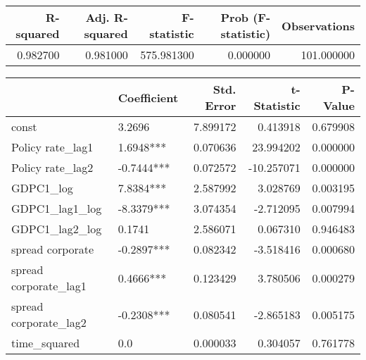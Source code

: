 \begin{tabular}{rrrrr}
\toprule
\textbf{R-squared} & \textbf{Adj. R-squared} & \textbf{F-statistic} & \textbf{Prob (F-statistic)} & \textbf{Observations} \\
\midrule
0.982700 & 0.981000 & 575.981300 & 0.000000 & 101.000000 \\
\bottomrule
\end{tabular}

\begin{tabular}{llrrr}
\toprule
 & \textbf{Coefficient} & \textbf{Std. Error} & \textbf{t-Statistic} & \textbf{P-Value} \\
\midrule
const & 3.2696 & 7.899172 & 0.413918 & 0.679908 \\
Policy rate_lag1 & 1.6948*** & 0.070636 & 23.994202 & 0.000000 \\
Policy rate_lag2 & -0.7444*** & 0.072572 & -10.257071 & 0.000000 \\
GDPC1_log & 7.8384*** & 2.587992 & 3.028769 & 0.003195 \\
GDPC1_lag1_log & -8.3379*** & 3.074354 & -2.712095 & 0.007994 \\
GDPC1_lag2_log & 0.1741 & 2.586071 & 0.067310 & 0.946483 \\
spread corporate & -0.2897*** & 0.082342 & -3.518416 & 0.000680 \\
spread corporate_lag1 & 0.4666*** & 0.123429 & 3.780506 & 0.000279 \\
spread corporate_lag2 & -0.2308*** & 0.080541 & -2.865183 & 0.005175 \\
time_squared & 0.0 & 0.000033 & 0.304057 & 0.761778 \\
\bottomrule
\end{tabular}
